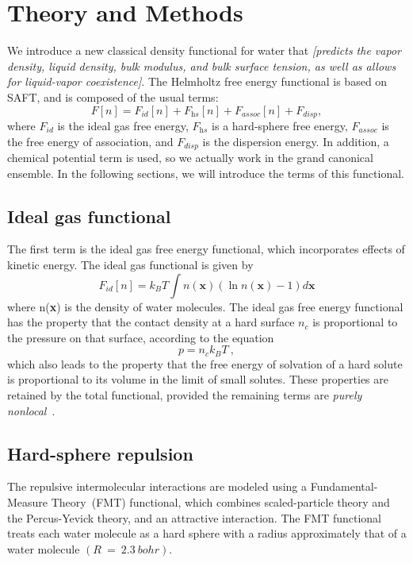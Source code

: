 \documentclass[letterpaper,twocolumn,amsmath,amssymb,prb]{revtex4-1}
\newcommand{\xx}{\textbf{x}}
\newcommand{\needsworklater}[1]{\emph{[#1]}}
\begin{document}
\section{Theory and Methods}
We introduce a new classical density functional for water that
\needsworklater{predicts the vapor density, liquid density, bulk
  modulus, and bulk surface tension, as well as allows for
  liquid-vapor coexistence}.  The Helmholtz free energy functional is
based on SAFT, and is composed of the usual terms:
\begin{equation}
  F[n] = F_\textit{id}[n] + F_\textit{hs}[n] + F_\textit{assoc}[n] + F_\textit{disp},
\end{equation}
where $F_\textit{id}$ is the ideal gas free energy, $F_\textit{hs}$ is
a hard-sphere free energy, $F_\textit{assoc}$ is the free energy of
association, and $F_\textit{disp}$ is the dispersion energy.  In
addition, a chemical potential term is used, so we actually work in
the grand canonical ensemble.  In the following sections, we will
introduce the terms of this functional.

\subsection{Ideal gas functional}
The first term is the ideal gas free energy functional,
which incorporates effects of kinetic energy.  The ideal gas
functional is given by
\begin{equation}\label{idealgas}
  F_{id}[n] = k_B T \int n(\xx)\left( \ln{n(\xx)} - 1\right) d\xx
\end{equation}
where n(\xx) is the density of water molecules.  The ideal gas free
energy functional has the property that the contact density at a hard
surface $n_c$ is proportional to the pressure on that surface,
according to the equation
\begin{equation}
  p = n_c k_BT \:,
\end{equation}
which also leads to the property that the free energy of solvation of
a hard solute is proportional to its volume in the limit of small
solutes.  These properties are retained by the total functional,
provided the remaining terms are \emph{purely
  nonlocal}~\cite{ashcroft?}.

\subsection{Hard-sphere repulsion}
The repulsive intermolecular interactions are modeled using a
Fundamental\nobreakdash-Measure Theory~\cite{rosenfeld1997}(FMT) functional,
which combines scaled-particle theory and the Percus-Yevick theory,
and an attractive interaction.  The FMT functional treats
each water molecule as a hard sphere with a radius approximately that of
a water molecule $(R~=~2.3~bohr)$.\\
\end{document}
